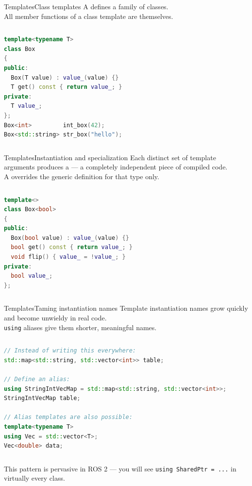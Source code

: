 \begin{frame}[fragile]{Templates}{Class templates}
	\justifying
	A  defines a family of classes.\\
	All member functions of a class template are  themselves.
	\begin{columns}
		\begin{lstlisting}[style=codebeamer, language=C++, caption=A minimal class template.]
template<typename T>
class Box
{
public:
  Box(T value) : value_(value) {}
  T get() const { return value_; }
private:
  T value_;
};
Box<int>         int_box(42);
Box<std::string> str_box("hello");
    \end{lstlisting}
	\end{columns}
\end{frame}
\begin{frame}[fragile]{Templates}{Instantiation and specialization}
	\justifying
	Each distinct set of template arguments produces a  — a completely independent piece of compiled code.\\
	A  overrides the generic definition for that type only.
	\begin{columns}
		\column{.9\textwidth}
		\begin{lstlisting}[style=codebeamer, language=C++, caption=Full specialization of \texttt{Box} for \texttt{bool}.]
template<>
class Box<bool>
{
public:
  Box(bool value) : value_(value) {}
  bool get() const { return value_; }
  void flip() { value_ = !value_; }
private:
  bool value_;
};
    \end{lstlisting}
	\end{columns}
\end{frame}
\begin{frame}[fragile]{Templates}{Taming instantiation names}
	\justifying
	Template instantiation names grow quickly and become unwieldy in real code.\\
	\texttt{using} aliases give them shorter, meaningful names.
	\begin{columns}
		\begin{lstlisting}[style=codebeamer, language=C++, caption=Type aliases for template instantiations.]
// Instead of writing this everywhere:
std::map<std::string, std::vector<int>> table;

// Define an alias:
using StringIntVecMap = std::map<std::string, std::vector<int>>;
StringIntVecMap table;

// Alias templates are also possible:
template<typename T>
using Vec = std::vector<T>;
Vec<double> data;
    \end{lstlisting}
	\end{columns}
	This pattern is pervasive in ROS 2 — you will see \texttt{using SharedPtr = ...} in virtually every class.
\end{frame}
